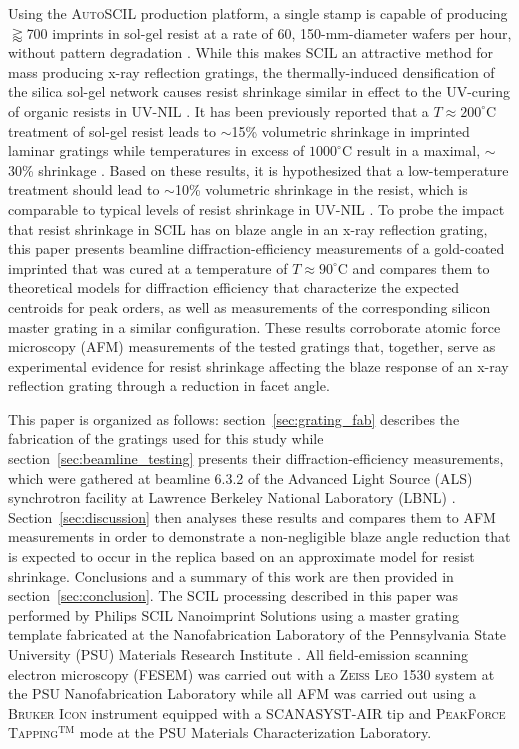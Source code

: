 \documentclass{osa-article}
\begin{document}
Using the \textsc{AutoSCIL} production platform, a single stamp is capable of producing $\gtrapprox$700 imprints in sol-gel resist at a rate of 60, 150-mm-diameter wafers per hour, without pattern degradation \cite{Verschuuren17,Verschuuren18,Verschuuren19}. 
While this makes SCIL an attractive method for mass producing x-ray reflection gratings, the thermally-induced densification of the silica sol-gel network causes resist shrinkage similar in effect to the UV-curing of organic resists in UV-NIL \cite{Schift10,Shibata10,Horiba_2012}.  
It has been previously reported that a $T \approx 200^{\circ}$C treatment of sol-gel resist leads to $\sim$15\% volumetric shrinkage in imprinted laminar gratings while temperatures in excess of $1000^{\circ}$C result in a maximal, $\sim$30\% shrinkage \cite{Verschuuren19}.   
Based on these results, it is hypothesized that a low-temperature treatment should lead to $\sim$10\% volumetric shrinkage in the resist, which is comparable to typical levels of resist shrinkage in UV-NIL \cite{Schift10}. 
To probe the impact that resist shrinkage in SCIL has on blaze angle in an x-ray reflection grating, this paper presents beamline diffraction-efficiency measurements of a gold-coated imprinted that was cured at a temperature of $T \approx 90^{\circ}$C and compares them to theoretical models for diffraction efficiency that characterize the expected centroids for peak orders, as well as measurements of the corresponding silicon master grating in a similar configuration. 
These results corroborate atomic force microscopy (AFM) measurements of the tested gratings that, together, serve as experimental evidence for resist shrinkage affecting the blaze response of an x-ray reflection grating through a reduction in facet angle. 

This paper is organized as follows: 
section~\ref{sec:grating_fab} describes the fabrication of the gratings used for this study while section~\ref{sec:beamline_testing} presents their diffraction-efficiency measurements, which were gathered at beamline 6.3.2 of the Advanced Light Source (ALS) synchrotron facility at Lawrence Berkeley National Laboratory (LBNL) \cite{als632,Gullikson01,Underwood96}. 
Section~\ref{sec:discussion} then analyses these results and compares them to AFM measurements in order to demonstrate a non-negligible blaze angle reduction that is expected to occur in the replica based on an approximate model for resist shrinkage. 
Conclusions and a summary of this work are then provided in section~\ref{sec:conclusion}. 
The SCIL processing described in this paper was performed by Philips SCIL Nanoimprint Solutions using a master grating template fabricated at the Nanofabrication Laboratory of the Pennsylvania State University (PSU) Materials Research Institute \cite{psu_mri}. 
All field-emission scanning electron microscopy (FESEM) was carried out with a \textsc{Zeiss Leo 1530} system at the PSU Nanofabrication Laboratory while all AFM was carried out using a \textsc{Bruker Icon} instrument equipped with a \textsc{SCANASYST-AIR} tip and \textsc{PeakForce Tapping}$^{\text{TM}}$ mode at the PSU Materials Characterization Laboratory. 
\end{document}
